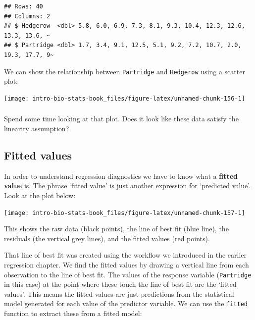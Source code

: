 \documentclass[
]{book}
\newenvironment{greybox}{
  \definecolor{shadecolor}{rgb}{0.95,0.95,0.95}  %
  \color{black}
  \begin{shaded}}
 {\end{shaded}}
\newenvironment{infobox}[1]
  {
  \begin{itemize}
  \renewcommand{\labelitemi}{
    \raisebox{-.7\height}[0pt][0pt]{
      {\setkeys{Gin}{width=3em,keepaspectratio}
        \texttt{[image: images/\#1]}}
    }
  }
  \setlength{\fboxsep}{1em}
  \begin{greybox}
  \item
  }
  {
  \end{greybox}
  \end{itemize}
  }
\begin{document}
\begin{verbatim}
## Rows: 40
## Columns: 2
## $ Hedgerow  <dbl> 5.8, 6.0, 6.9, 7.3, 8.1, 9.3, 10.4, 12.3, 12.6, 13.3, 13.6, ~
## $ Partridge <dbl> 1.7, 3.4, 9.1, 12.5, 5.1, 9.2, 7.2, 10.7, 2.0, 19.3, 17.7, 9~
\end{verbatim}

We can show the relationship between \texttt{Partridge} and \texttt{Hedgerow} using a scatter plot:

\begin{center}\texttt{[image: intro-bio-stats-book\_files/figure-latex/unnamed-chunk-156-1]} \end{center}

\begin{infobox}{action}

\hypertarget{section-13}{%
\subsubsection*{}\label{section-13}}

Spend some time looking at that plot. Does it look like these data satisfy the linearity assumption?

\end{infobox}

\hypertarget{fitted-values}{%
\subsection{Fitted values}\label{fitted-values}}

In order to understand regression diagnostics we have to know what a \textbf{fitted value} is. The phrase `fitted value' is just another expression for `predicted value'. Look at the plot below:

\begin{center}\texttt{[image: intro-bio-stats-book\_files/figure-latex/unnamed-chunk-157-1]} \end{center}

This shows the raw data (black points), the line of best fit (blue line), the residuals (the vertical grey lines), and the fitted values (red points).

That line of best fit was created using the workflow we introduced in the earlier regression chapter. We find the fitted values by drawing a vertical line from each observation to the line of best fit. The values of the response variable (\texttt{Partridge} in this case) at the point where these touch the line of best fit are the `fitted values'. This means the fitted values are just predictions from the statistical model generated for each value of the predictor variable. We can use the \texttt{fitted} function to extract these from a fitted model:
\end{document}
